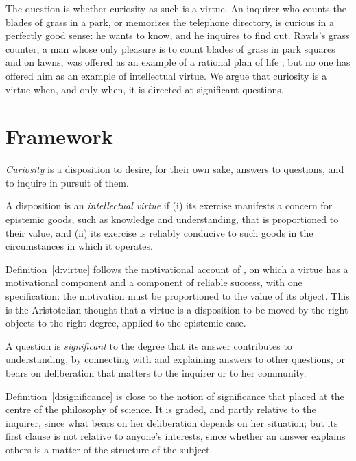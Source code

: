 \documentclass{situationist-preprint}
\begin{document}
The question is whether curiosity as such is a virtue. An inquirer who counts the blades of grass in a park, or memorizes the telephone directory, is curious in a perfectly good sense: he wants to know, and he inquires to find out. Rawls's grass counter, a man whose only pleasure is to count blades of grass in park squares and on lawns, was offered as an example of a rational plan of life \citep[\S 65]{Rawls1971}; but no one has offered him as an example of intellectual virtue. We argue that curiosity is a virtue when, and only when, it is directed at significant questions.

\section{Framework}

\begin{definition}[Curiosity]\label{d:curiosity}
\emph{Curiosity} is a disposition to desire, for their own sake, answers to questions, and to inquire in pursuit of them.
\end{definition}

\begin{definition}\label{d:virtue}
A disposition is an \emph{intellectual virtue} if (i) its exercise manifests a concern for epistemic goods, such as knowledge and understanding, that is proportioned to their value, and (ii) its exercise is reliably conducive to such goods in the circumstances in which it operates.
\end{definition}

Definition~\ref{d:virtue} follows the motivational account of \citet{Zagzebski1996}, on which a virtue has a motivational component and a component of reliable success, with one specification: the motivation must be proportioned to the value of its object. This is the Aristotelian thought that a virtue is a disposition to be moved by the right objects to the right degree, applied to the epistemic case.

\begin{definition}[Significance]\label{d:significance}
A question is \emph{significant} to the degree that its answer contributes to understanding, by connecting with and explaining answers to other questions, or bears on deliberation that matters to the inquirer or to her community.
\end{definition}

Definition~\ref{d:significance} is close to the notion of significance that \citet{Kitcher2001} placed at the centre of the philosophy of science. It is graded, and partly relative to the inquirer, since what bears on her deliberation depends on her situation; but its first clause is not relative to anyone's interests, since whether an answer explains others is a matter of the structure of the subject.
\end{document}
